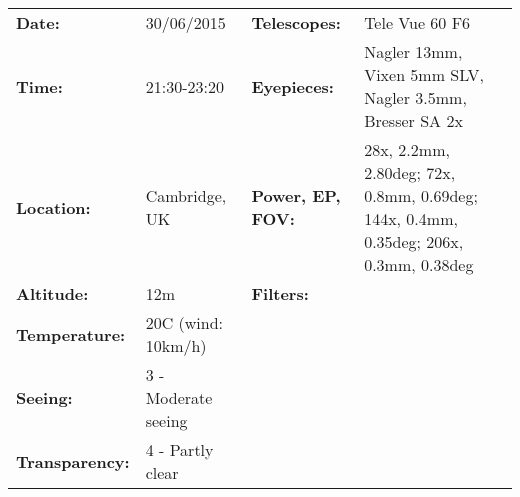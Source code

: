 \begin{tabular}{ p{0.9in} p{1.3in} p{1.2in} p{5.2in}}
{\bf Date:} & 30/06/2015 & {\bf Telescopes:} & Tele Vue 60 F6 \\ 
{\bf Time:} & 21:30-23:20 & {\bf Eyepieces:} & Nagler 13mm, Vixen 5mm SLV, Nagler 3.5mm, Bresser SA 2x \\ 
{\bf Location:} & Cambridge, UK & {\bf Power, EP, FOV:} & 28x, 2.2mm, 2.80deg; 72x, 0.8mm, 0.69deg; 144x, 0.4mm, 0.35deg; 206x, 0.3mm, 0.38deg \\ 
{\bf Altitude:} & 12m & {\bf Filters:} &  \\ 
{\bf Temperature:} & 20C (wind: 10km/h) & & \\ 
{\bf Seeing:} & 3 - Moderate seeing & & \\ 
{\bf Transparency:} & 4 - Partly clear & & \\ 
\end{tabular}
\centering 
